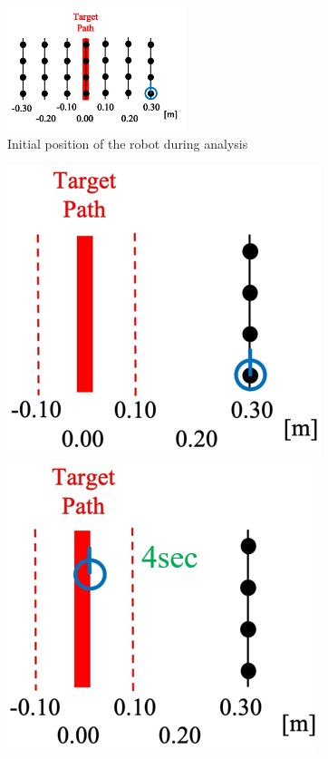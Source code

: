 \documentclass{jarticle}
\begin{document}
\begin{figure}[h!]
  \centering
   \includegraphics[height=36mm]{./figs/k.png}
   \caption{Initial position of the robot during analysis}
\end{figure}


\begin{figure}[htbp]
  \begin{minipage}[t]{0.5\linewidth}
    \centering
    \includegraphics[keepaspectratio, scale=0.43]{figs/1.png}
  \end{minipage}
  \begin{minipage}[t]{0.5\linewidth}
    \centering
    \includegraphics[keepaspectratio, scale=0.43]{figs/2.png}

\end{minipage}
\end{figure}
\end{document}
